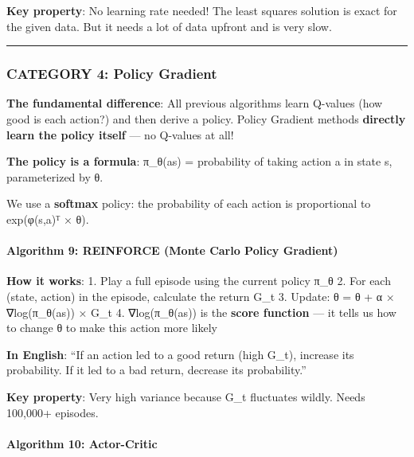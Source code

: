 \documentclass[
]{article}
\begin{document}
\textbf{Key property}: No learning rate needed! The least squares
solution is exact for the given data. But it needs a lot of data upfront
and is very slow.

\begin{center}\rule{0.5\linewidth}{0.5pt}\end{center}

\hypertarget{category-4-policy-gradient}{%
\subsubsection{CATEGORY 4: Policy
Gradient}\label{category-4-policy-gradient}}

\textbf{The fundamental difference}: All previous algorithms learn
Q-values (how good is each action?) and then derive a policy. Policy
Gradient methods \textbf{directly learn the policy itself} --- no
Q-values at all!

\textbf{The policy is a formula}: π\_θ(a\textbar s) = probability of
taking action a in state s, parameterized by θ.

We use a \textbf{softmax} policy: the probability of each action is
proportional to exp(φ(s,a)ᵀ × θ).

\hypertarget{algorithm-9-reinforce-monte-carlo-policy-gradient}{%
\paragraph{Algorithm 9: REINFORCE (Monte Carlo Policy
Gradient)}\label{algorithm-9-reinforce-monte-carlo-policy-gradient}}

\textbf{How it works}: 1. Play a full episode using the current policy
π\_θ 2. For each (state, action) in the episode, calculate the return
G\_t 3. Update: θ = θ + α × ∇log(π\_θ(a\textbar s)) × G\_t 4.
∇log(π\_θ(a\textbar s)) is the \textbf{score function} --- it tells us
how to change θ to make this action more likely

\textbf{In English}: ``If an action led to a good return (high G\_t),
increase its probability. If it led to a bad return, decrease its
probability.''

\textbf{Key property}: Very high variance because G\_t fluctuates
wildly. Needs 100,000+ episodes.

\hypertarget{algorithm-10-actor-critic}{%
\paragraph{Algorithm 10: Actor-Critic}\label{algorithm-10-actor-critic}}
\end{document}
